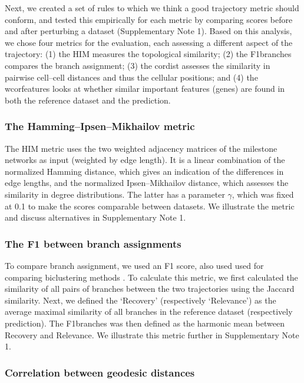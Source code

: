 Next, we created a set of rules to which we think a good trajectory metric should conform, and tested this empirically for each metric by comparing scores before and after perturbing a dataset (Supplementary Note 1). Based on this analysis, we chose four metrics for the evaluation, each assessing a different aspect of the trajectory: (1) the HIM measures the topological similarity; (2) the F1branches compares the branch assignment; (3) the cordist assesses the similarity in pairwise cell–cell distances and thus the cellular positions; and (4) the wcorfeatures looks at whether similar important features (genes) are found in both the reference dataset and the prediction.

\subsubsection{The Hamming–Ipsen–Mikhailov metric}

The HIM metric \cite{jurman_himglocalmetric_2015} uses the two weighted adjacency matrices of the milestone networks as input (weighted by edge length). It is a linear combination of the normalized Hamming distance, which gives an indication of the differences in edge lengths, and the normalized Ipsen–Mikhailov distance, which assesses the similarity in degree distributions. The latter has a parameter $\gamma$, which was fixed at 0.1 to make the scores comparable between datasets. We illustrate the metric and discuss alternatives in Supplementary Note 1.

\subsubsection{The F1 between branch assignments}

To compare branch assignment, we used an F1 score, also used used for comparing biclustering methods \cite{saelens_comprehensiveevaluationmodule_2018}. To calculate this metric, we first calculated the similarity of all pairs of branches between the two trajectories using the Jaccard similarity. Next, we defined the ‘Recovery' (respectively ‘Relevance') as the average maximal similarity of all branches in the reference dataset (respectively prediction). The F1branches was then defined as the harmonic mean between Recovery and Relevance. We illustrate this metric further in Supplementary Note 1.

\subsubsection{Correlation between geodesic distances}

